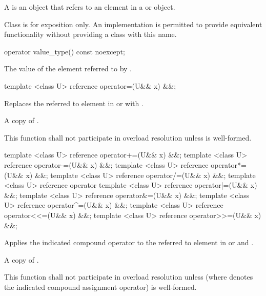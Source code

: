 \label{sec:reference type}
\pnum A  is an object that refers to an element in a \simd or \mask object.

\pnum Class  is for exposition only.
An implementation is permitted to provide equivalent functionality without providing a class with this name.



\begin{itemdecl}
operator value_type() const noexcept;
\end{itemdecl}
\begin{itemdescr}
  \pnum\returns The value of the element referred to by .
\end{itemdescr}

\begin{itemdecl}
template <class U> reference operator=(U&& x) &&;
\end{itemdecl}
\begin{itemdescr}
  \pnum\effects Replaces the referred to element in \simd or \mask with .

  \pnum\returns A copy of .

  \pnum\remarks This function shall not participate in overload resolution unless  is well-formed.
\end{itemdescr}

\begin{itemdecl}
template <class U> reference operator+=(U&& x) &&;
template <class U> reference operator-=(U&& x) &&;
template <class U> reference operator*=(U&& x) &&;
template <class U> reference operator/=(U&& x) &&;
template <class U> reference operator%
template <class U> reference operator|=(U&& x) &&;
template <class U> reference operator&=(U&& x) &&;
template <class U> reference operator^=(U&& x) &&;
template <class U> reference operator<<=(U&& x) &&;
template <class U> reference operator>>=(U&& x) &&;
\end{itemdecl}
\begin{itemdescr}
  \pnum\effects Applies the indicated compound operator to the referred to element in \simd or \mask and .

  \pnum\returns A copy of .

  \pnum\remarks This function shall not participate in overload resolution unless  (where  denotes the indicated compound assignment operator) is well-formed.
\end{itemdescr}

